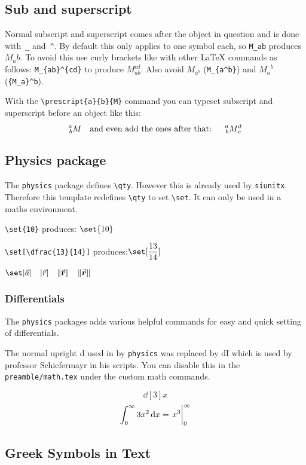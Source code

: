 \subsection{Sub and superscript}
    Normal subscript and superscript comes after the object in question and is done with~\texttt{\_} and~\texttt{\^}. By default this only applies to one symbol each, so \verb|M_ab| produces $M_ab$. To avoid this use curly brackets like with other \LaTeX{} commands as follows: \verb|M_{ab}^{cd}| to produce $M_{ab}^{cd}$. Also avoid $M_{a^b}$ (\verb*|M_{a^b}|) and ${M_a}^b$ (\verb*|{M_a}^b|).

    With the \verb|\prescript{a}{b}{M}| command you can typeset subscript and superscript before an object like this:
    \[
        \prescript{a}{b}{M}
        \text{\quad and even add the ones after that: \quad}
        \prescript{a}{b}{M}_c^d
    \]



\subsection{Physics package}

    The \verb|physics| package defines \verb|\qty|. However this is already used by \texttt{siunitx}. Therefore this template redefines \verb|\qty| to set \verb|\set|. It can only be used in a maths environment.

    \verb|\set{10}| produces: $\set{10}$

    \verb|\set[\dfrac{13}{14}]|     produces:$\set[\dfrac{13}{14}]$

    $\set|\vec{a}| \quad  \abs{\vec{r}} \quad \norm{\va{r}} \quad \norm{\va*{r}} $

    \subsubsection{Differentials}

        The \texttt{physics} packages adds various helpful commands for easy and quick setting of differentials.

        The normal upright d used in by \texttt{physics} was replaced by $\mathrm{d\!I}$ which is used by professor Schiefermayr in his scripts. You can disable this in the \texttt{preamble/math.tex} under the custom math commands.

         \[ \dd[3]{x} \]
         \[ \int_{0}^{\infty} 3x^2 \dd{x} = \eval{x^3}_{0}^{\infty} \]

\subsection{Greek Symbols in Text}

